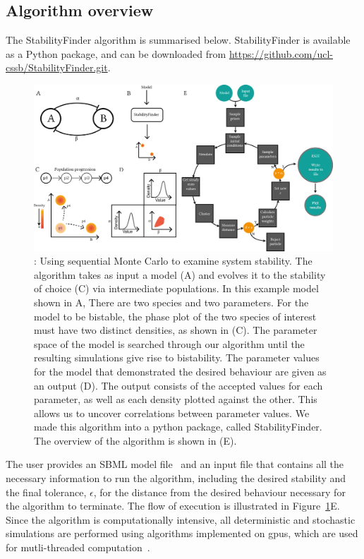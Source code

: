 \subsection{Algorithm overview}
\label{sec:Alg_overview}
The StabilityFinder algorithm is summarised below. StabilityFinder is available as a Python package, and can be downloaded from \url{https://github.com/ucl-cssb/StabilityFinder.git}. 

\begin{figure}[h]
\begin{center}
\includegraphics[scale=0.9]{../../chapters/chapterStabilityFinder/images/SF_algo_overv.png}
\caption[StabilityFinder algorithm overview]{\label{fig:fig1}: Using sequential Monte Carlo to examine system stability. The algorithm takes as input a model (A) and evolves it to the stability of choice (C) via intermediate populations. In this example model shown in A, There are two species and two parameters. For the model to be bistable, the phase plot of the two species of interest must have two distinct densities, as shown in (C). The parameter space of the model is searched through our algorithm until the resulting simulations give rise to bistability. The parameter values for the model that demonstrated the desired behaviour are given as an output (D). The output consists of the accepted values for each parameter, as well as each density plotted against the other. This allows us to uncover correlations between parameter values. We made this algorithm into a python package, called StabilityFinder. The overview of the algorithm is shown in (E).}
\end{center}
\end{figure}
\clearpage

The user provides an SBML model file~\autocite{Finney:2003vk, Hucka:2004wh} and an input file that contains all the necessary information to run the algorithm, including the desired stability and the final tolerance, $\epsilon$, for the distance from the desired behaviour necessary for the algorithm to terminate. The flow of execution is illustrated in Figure~\ref{fig:fig1}E. Since the algorithm is computationally intensive, all deterministic and stochastic simulations are performed using algorithms implemented on \acrfull{gpu}s, which are used for mutli-threaded computation~\autocite{Kirk:2010we}.



